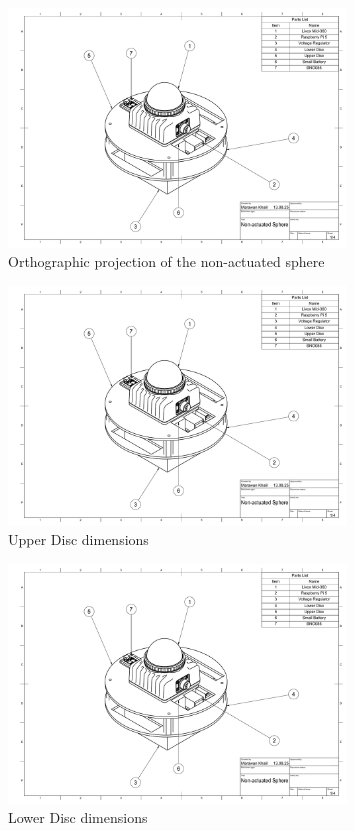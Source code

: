 \documentclass[english, bachelor, utf8]{base/thesis_telematics}
\begin{document}
\begin{figure}[H]
\centering
\includegraphics[width=0.80\textwidth,page=2]{pics/Non_actuated_Sphere_drawing.pdf}
\caption{Orthographic projection of the non-actuated sphere}
\label{fig:system_page2}
\end{figure}

\begin{figure}[H]
\centering
\includegraphics[width=0.80\textwidth,page=3]{pics/Non_actuated_Sphere_drawing.pdf}
\caption{Upper Disc dimensions}
\label{fig:system_page3}
\end{figure}

\begin{figure}[H]
\centering
\includegraphics[width=0.80\textwidth,page=4]{pics/Non_actuated_Sphere_drawing.pdf}
\caption{Lower Disc dimensions}
\label{fig:system_page4}
\end{figure}
\end{document}
